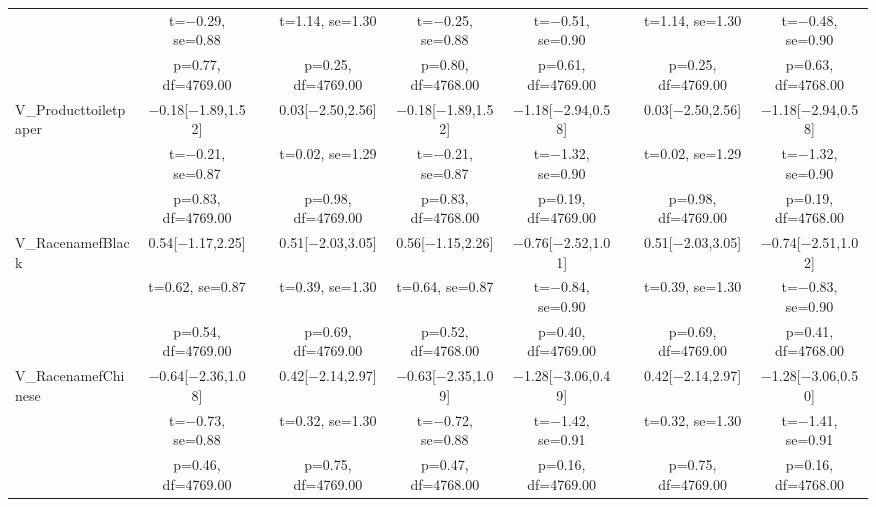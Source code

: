 \documentclass[]{report}
\begin{document}
\begin{table}
{\begin{tabular}[t]{lcccccccc}
		& t=\num{-0.29}, se=\num{0.88} &  & t=\num{1.14}, se=\num{1.30} & t=\num{-0.25}, se=\num{0.88} & t=\num{-0.51}, se=\num{0.90} &  & t=\num{1.14}, se=\num{1.30} & t=\num{-0.48}, se=\num{0.90}\\
		& p=\num{0.77}, df=\num{4769.00} &  & p=\num{0.25}, df=\num{4769.00} & p=\num{0.80}, df=\num{4768.00} & p=\num{0.61}, df=\num{4769.00} &  & p=\num{0.25}, df=\num{4769.00} & p=\num{0.63}, df=\num{4768.00}\\
		V\_Producttoiletpaper & \num{-0.18}[\num{-1.89},\num{1.52}] &  & \num{0.03}[\num{-2.50},\num{2.56}] & \num{-0.18}[\num{-1.89},\num{1.52}] & \num{-1.18}[\num{-2.94},\num{0.58}] &  & \num{0.03}[\num{-2.50},\num{2.56}] & \num{-1.18}[\num{-2.94},\num{0.58}]\\
		& t=\num{-0.21}, se=\num{0.87} &  & t=\num{0.02}, se=\num{1.29} & t=\num{-0.21}, se=\num{0.87} & t=\num{-1.32}, se=\num{0.90} &  & t=\num{0.02}, se=\num{1.29} & t=\num{-1.32}, se=\num{0.90}\\
		& p=\num{0.83}, df=\num{4769.00} &  & p=\num{0.98}, df=\num{4769.00} & p=\num{0.83}, df=\num{4768.00} & p=\num{0.19}, df=\num{4769.00} &  & p=\num{0.98}, df=\num{4769.00} & p=\num{0.19}, df=\num{4768.00}\\
		V\_RacenamefBlack & \num{0.54}[\num{-1.17},\num{2.25}] &  & \num{0.51}[\num{-2.03},\num{3.05}] & \num{0.56}[\num{-1.15},\num{2.26}] & \num{-0.76}[\num{-2.52},\num{1.01}] &  & \num{0.51}[\num{-2.03},\num{3.05}] & \num{-0.74}[\num{-2.51},\num{1.02}]\\
		& t=\num{0.62}, se=\num{0.87} &  & t=\num{0.39}, se=\num{1.30} & t=\num{0.64}, se=\num{0.87} & t=\num{-0.84}, se=\num{0.90} &  & t=\num{0.39}, se=\num{1.30} & t=\num{-0.83}, se=\num{0.90}\\
		& p=\num{0.54}, df=\num{4769.00} &  & p=\num{0.69}, df=\num{4769.00} & p=\num{0.52}, df=\num{4768.00} & p=\num{0.40}, df=\num{4769.00} &  & p=\num{0.69}, df=\num{4769.00} & p=\num{0.41}, df=\num{4768.00}\\
		V\_RacenamefChinese & \num{-0.64}[\num{-2.36},\num{1.08}] &  & \num{0.42}[\num{-2.14},\num{2.97}] & \num{-0.63}[\num{-2.35},\num{1.09}] & \num{-1.28}[\num{-3.06},\num{0.49}] &  & \num{0.42}[\num{-2.14},\num{2.97}] & \num{-1.28}[\num{-3.06},\num{0.50}]\\
		& t=\num{-0.73}, se=\num{0.88} &  & t=\num{0.32}, se=\num{1.30} & t=\num{-0.72}, se=\num{0.88} & t=\num{-1.42}, se=\num{0.91} &  & t=\num{0.32}, se=\num{1.30} & t=\num{-1.41}, se=\num{0.91}\\
		& p=\num{0.46}, df=\num{4769.00} &  & p=\num{0.75}, df=\num{4769.00} & p=\num{0.47}, df=\num{4768.00} & p=\num{0.16}, df=\num{4769.00} &  & p=\num{0.75}, df=\num{4769.00} & p=\num{0.16}, df=\num{4768.00}\\

\end{tabular}}
\end{table}
\end{document}
